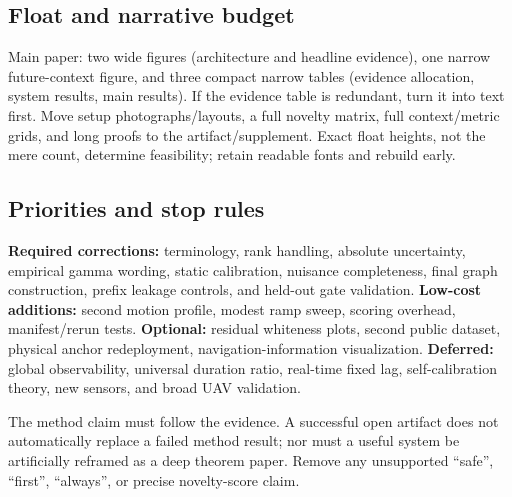 \documentclass[conference]{IEEEtran}%
\begin{document}
\subsection{Float and narrative budget}
Main paper: two wide figures (architecture and headline evidence), one narrow future-context figure, and three compact narrow tables (evidence allocation, system results, main results). If the evidence table is redundant, turn it into text first. Move setup photographs/layouts, a full novelty matrix, full context/metric grids, and long proofs to the artifact/supplement. Exact float heights, not the mere count, determine feasibility; retain readable fonts and rebuild early.

\subsection{Priorities and stop rules}
\textbf{Required corrections:} terminology, rank handling, absolute uncertainty, empirical gamma wording, static calibration, nuisance completeness, final graph construction, prefix leakage controls, and held-out gate validation.
\textbf{Low-cost additions:} second motion profile, modest ramp sweep, scoring overhead, manifest/rerun tests.
\textbf{Optional:} residual whiteness plots, second public dataset, physical anchor redeployment, navigation-information visualization.
\textbf{Deferred:} global observability, universal duration ratio, real-time fixed lag, self-calibration theory, new sensors, and broad UAV validation.

The method claim must follow the evidence. A successful open artifact does not automatically replace a failed method result; nor must a useful system be artificially reframed as a deep theorem paper. Remove any unsupported ``safe'', ``first'', ``always'', or precise novelty-score claim.
\fi
\end{document}
